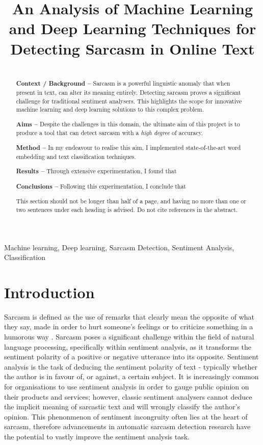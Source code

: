 \documentclass[12pt,a4paper]{article}
\title{An Analysis of Machine Learning and Deep Learning Techniques for Detecting Sarcasm in Online Text}
\author{} %
\date{}
\begin{document}
\maketitle

\begin{abstract}
\\ \indent \textbf{Context / Background --} 
Sarcasm is a powerful linguistic anomaly that when present in text, can alter its meaning entirely. Detecting sarcasm proves a significant challenge for traditional sentiment analysers. This highlights the scope for innovative machine learning and deep learning solutions to this complex problem.

\indent \textbf{Aims --} Despite the challenges in this domain, the ultimate aim of this project is to produce a tool that can detect sarcasm with a \textit{high degree} of accuracy.

\indent \textbf{Method --} In my endeavour to realise this aim, I implemented state-of-the-art word embedding and text classification techniques.

\indent \textbf{Results --} Through extensive experimentation, I found that

\indent \textbf{Conclusions --} Following this experimentation, I conclude that

This section should not be longer than half of a page, and having no more than one or two sentences under each heading is advised. Do not cite references in the abstract.
\end{abstract}

\begin{keywords}
Machine learning, Deep learning, Sarcasm Detection, Sentiment Analysis, Classification
\end{keywords}


\section{Introduction}
\noindent Sarcasm is defined as the use of remarks that clearly mean the opposite of what they say, made in order to hurt someone's feelings or to criticize something in a humorous way \cite{cambridgesarcasm2020}. Sarcasm poses a significant challenge within the field of natural language processing, specifically within sentiment analysis, as it transforms the sentiment polarity of a positive or negative utterance into its opposite. Sentiment analysis is the task of deducing the sentiment polarity of text - typically whether the author is in favour of, or against, a certain subject. It is increasingly common for organisations to use sentiment analysis in order to gauge public opinion on their products and services; however, classic sentiment analysers cannot deduce the implicit meaning of sarcastic text and will wrongly classify the author's opinion. This phenonmenon of sentiment incongruity often lies at the heart of sarcasm, therefore advancements in automatic sarcasm detection research have the potential to vastly improve the sentiment analysis task.
\end{document}
